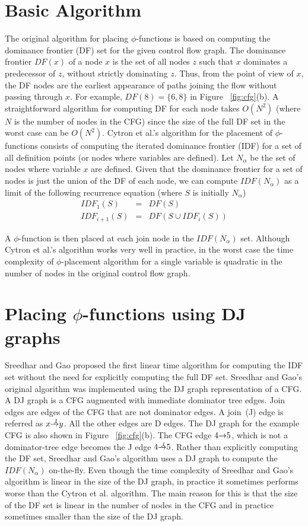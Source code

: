 {\section{Basic Algorithm}
The original algorithm for placing $\phi$-functions
is based on computing the dominance frontier  (DF) set for the given control flow graph. The dominance frontier $DF(x)$ of a node $x$ is the set of all nodes 
 $z$ such that $x$ dominates a predecessor of $z$, without strictly dominating $z$. Thus, from the point of view of $x$, the DF nodes are the earliest appearance of paths joining the flow without passing through $x$.
For example, $DF(8)= \{ 6, 8 \}$ in Figure ~\ref{fig:cfg}(b). A straightforward algorithm for computing
DF for each node takes $O(N^2)$ (where $N$ is the number of nodes in the CFG) since the size of the full DF set in the worst case can be $O(N^2)$.
Cytron et al.'s algorithm for the placement of $\phi$-functions consists of computing the iterated dominance frontier (IDF) for a set of all definition points (or nodes where
variables are defined). 
Let $N_{\alpha}$ be the set of nodes where variable $x$ are  defined.
Given that the dominance frontier for a set of nodes is just the
union of the DF of each node, we can compute $IDF(N_\alpha)$ as a limit of
the following recurrence equation (where $S$ is initially $N_\alpha$)
\begin{eqnarray*}
IDF_1(S) &=& DF(S) \\
IDF_{i+1} (S) &=& DF(S \cup IDF_i(S)) 
\end{eqnarray*}

A $\phi$-function is then placed at each join node in the  $IDF(N_{\alpha})$ set. 
Although Cytron et al.'s
algorithm works very well in practice, in the worst case the time complexity of $\phi$-placement algorithm for a single variable is quadratic in the number of nodes in the original control flow graph.


\section{Placing $\phi$-functions using DJ graphs}
Sreedhar and Gao proposed the first linear time algorithm for computing the IDF set without the need for explicitly computing the full DF set. Sreedhar and Gao's original algorithm was implemented using the DJ graph representation of a CFG. A DJ graph
is a CFG augmented with immediate dominator tree edges.  
Join edges are edges of the CFG that are not dominator edges. A join~(J) edge is referred as $x \st{J} y$. All the other edges are D edges. 
The DJ graph for the example CFG is also shown in Figure ~\ref{fig:cfg}(b). The CFG edge $4 \st{} 5$, which is not a dominator-tree edge becomes the J edge $4 \st{J} 5$. Rather than explicitly computing the DF set, Sreedhar and Gao's algorithm uses a DJ graph to compute the  $IDF(N_{\alpha})$ on-the-fly. Even though the time complexity of Sreedhar and Gao's algorithm is linear in the size of the DJ graph, in practice it sometimes performs worse than the Cytron et al. algorithm. The main reason for this is that the size of the DF set is linear in the number of nodes in the CFG 
and in practice sometimes smaller than the size of the DJ graph. 


}
